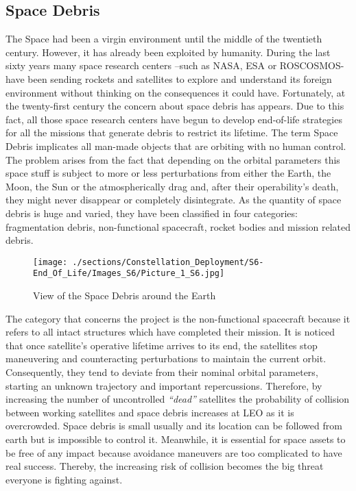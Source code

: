 \subsection{Space Debris}
The Space had been a virgin environment until the middle of the twentieth century. However, it has already been exploited by humanity. During the last sixty years many space research centers –such as NASA, ESA or ROSCOSMOS- have been sending rockets and satellites to explore and understand its foreign environment without thinking on the consequences it could have. Fortunately, at the twenty-first century the concern about space debris has appears. Due to this fact, all those space research centers have begun to develop end-of-life strategies for all the missions that generate debris to restrict its lifetime. 
\newline
\newline
The term Space Debris implicates all man-made objects that are orbiting with no human control. The problem arises from the fact that depending on the orbital parameters this space stuff is subject to more or less perturbations from either the Earth, the Moon, the Sun or the atmospherically drag and, after their operability’s death, they might never disappear or completely disintegrate. As the quantity of space debris is huge and varied, they have been classified in four categories: fragmentation debris, non-functional spacecraft, rocket bodies and mission related debris. 
\newline
\newline
\begin{figure}
\centering 
\texttt{[image: ./sections/Constellation\_Deployment/S6-End\_Of\_Life/Images\_S6/Picture\_1\_S6.jpg]} 
\caption{View of the Space Debris around the Earth}
\end{figure}
\newline
\newline
 The category that concerns the project is the non-functional spacecraft because it refers to all intact structures which have completed their mission. It is noticed that once satellite’s operative lifetime arrives to its end, the satellites stop maneuvering and counteracting perturbations to maintain the current orbit. Consequently, they tend to deviate from their nominal orbital parameters, starting an unknown trajectory and important repercussions. 
\newline
\newline
Therefore, by increasing the number of uncontrolled \textit{``dead''} satellites the probability of collision between working satellites and space debris increases at LEO as it is overcrowded. Space debris is small usually and its location can be followed from earth but is impossible to control it. Meanwhile, it is essential for space assets to be free of any impact because avoidance maneuvers are too complicated to have real success.  Thereby, the increasing risk of collision becomes the big threat everyone is fighting against. 

